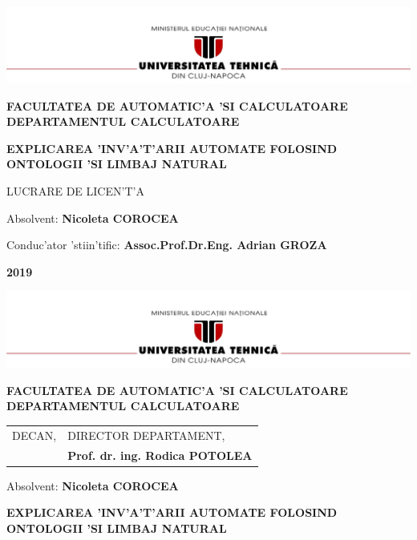 \documentclass[12pt,a4paper,twoside]{report}
\renewcommand{\thesisauthor}{Nicoleta COROCEA}    %
\renewcommand{\thesisyear}{2019}      %
\renewcommand{\thesistitle}{EXPLICAREA 'INV'A'T'ARII AUTOMATE FOLOSIND ONTOLOGII 'SI LIMBAJ NATURAL} %
\renewcommand{\thesissupervisor}{Assoc.Prof.Dr.Eng. Adrian GROZA}
\newcommand{\department}{FACULTATEA DE AUTOMATIC'A 'SI CALCULATOARE\\
DEPARTAMENTUL CALCULATOARE}
\newcommand{\thesis}{LUCRARE DE LICEN'T'A}
\newcommand{\utcnlogo}{\includegraphics[width=15cm]{img/utcn.jpg}}
\begin{document}

\newenvironment{definition}[1][Defini'tie.]{\begin{trivlist}
\item[\hskip \labelsep {\bfseries #1}]}{\end{trivlist}}





\begin{center}
\utcnlogo

{\bf \department}

\vspace{4cm}

{\bf \thesistitle} %

\vspace{1.5cm}

\thesis

\vspace{6cm}

Absolvent: {\bf \thesisauthor} 

Conduc'ator 'stiin'tific: {\bf \thesissupervisor}

\vspace{3cm}
{\bf \thesisyear}
\end{center}

\thispagestyle{empty}
\newpage

\begin{center}
\utcnlogo

{\bf \department}
\end{center}
\vspace{0.5cm}

\begin{tabular}{p{7cm}p{8cm}}
 \hspace{-1cm}DECAN, & DIRECTOR DEPARTAMENT,\\
\hspace{-1cm}{\bf Prof. dr. ing. Liviu MICLEA} & {\bf Prof. dr. ing. Rodica POTOLEA}\\  
\end{tabular}
 
\vspace{2cm}

\begin{center}
Absolvent: {\bf \thesisauthor}

\vspace{1cm}

{\bf \thesistitle}
\end{center}
\end{document}
